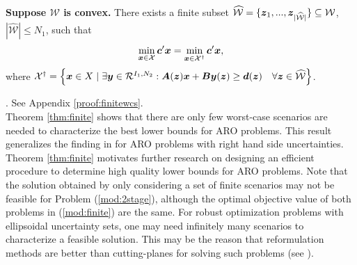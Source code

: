 \documentclass[fleqn,isre,blindrev]{informs4}
\newcommand{\mb}[1]{\mbox{\boldmath \ensuremath{#1}}}
\begin{document}
 { \begin{theorem} \label{thm:finite}
		\textbf{Suppose $\mathcal{W}$ is convex.} There exists a finite subset $\widehat{\mathcal{W}} =\{\mb{z}_1, ..., \mb{z}_{|\widehat{\mathcal{W}}|}\} \subseteq \mathcal{W}$, $|\widehat{\mathcal{W}}| \le N_1$, such that
\begin{equation} \label{mod:finite}
		\min_{\boldsymbol{x} \in \mathcal{X}} \mb{c}'\mb{x} = \min_{\boldsymbol{x} \in \mathcal{X}^{\dagger}} \mb{c}'\mb{x},
\end{equation}
		where $\mathcal{X}^{\dagger} = \left\{ \mb{x} \in X \hspace{3pt} | \hspace{3pt}  \exists \mb{y} \in \mathcal{R}^{I_1,N_2}: \mb{A}(\mb{z}) \mb{x}+\mb{B}\mb{y}(\mb{z}) \geq\mb{d}(\mb{z})  \quad  \forall \mb{z} \in  \widehat{\mathcal{W}} \right\} $.
	\end{theorem}	
	. See Appendix \ref{proof:finitewcs}. \hfill \Halmos\\
		
	Theorem \ref{thm:finite} shows that there are only few worst-case scenarios are needed to characterize the best lower bounds for ARO problems. This result generalizes the finding in \cite[Theorem 4.4]{hgk11} for ARO problems with right hand side uncertainties. 	Theorem \ref{thm:finite}  motivates further research on designing an efficient procedure to determine high quality lower bounds for ARO problems. Note that the solution obtained by only considering a set of finite scenarios may not be feasible for Problem (\ref{mod:2stage}), although the optimal objective value of both problems in (\ref{mod:finite}) are the same. For robust optimization problems with ellipsoidal uncertainty sets, one may need infinitely many scenarios to characterize a feasible solution. This may be the reason that reformulation methods are better than cutting-planes for solving such problems (see \cite{bdl15}).

}	\fi 
	
	
	
\end{document}
